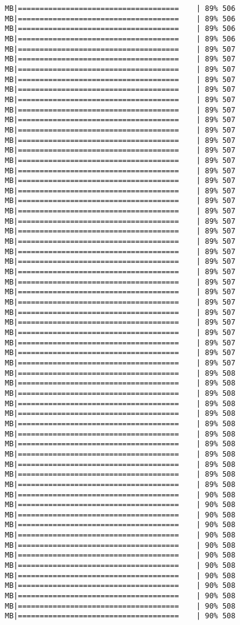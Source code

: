 \documentclass[
]{article}
\begin{document}
\begin{verbatim}
MB|=====================================    | 89% 506 MB|=====================================    | 89% 506 MB|=====================================    | 89% 506 MB|=====================================    | 89% 506 MB|=====================================    | 89% 507 MB|=====================================    | 89% 507 MB|=====================================    | 89% 507 MB|=====================================    | 89% 507 MB|=====================================    | 89% 507 MB|=====================================    | 89% 507 MB|=====================================    | 89% 507 MB|=====================================    | 89% 507 MB|=====================================    | 89% 507 MB|=====================================    | 89% 507 MB|=====================================    | 89% 507 MB|=====================================    | 89% 507 MB|=====================================    | 89% 507 MB|=====================================    | 89% 507 MB|=====================================    | 89% 507 MB|=====================================    | 89% 507 MB|=====================================    | 89% 507 MB|=====================================    | 89% 507 MB|=====================================    | 89% 507 MB|=====================================    | 89% 507 MB|=====================================    | 89% 507 MB|=====================================    | 89% 507 MB|=====================================    | 89% 507 MB|=====================================    | 89% 507 MB|=====================================    | 89% 507 MB|=====================================    | 89% 507 MB|=====================================    | 89% 507 MB|=====================================    | 89% 507 MB|=====================================    | 89% 507 MB|=====================================    | 89% 507 MB|=====================================    | 89% 507 MB|=====================================    | 89% 507 MB|=====================================    | 89% 508 MB|=====================================    | 89% 508 MB|=====================================    | 89% 508 MB|=====================================    | 89% 508 MB|=====================================    | 89% 508 MB|=====================================    | 89% 508 MB|=====================================    | 89% 508 MB|=====================================    | 89% 508 MB|=====================================    | 89% 508 MB|=====================================    | 89% 508 MB|=====================================    | 89% 508 MB|=====================================    | 89% 508 MB|=====================================    | 90% 508 MB|=====================================    | 90% 508 MB|=====================================    | 90% 508 MB|=====================================    | 90% 508 MB|=====================================    | 90% 508 MB|=====================================    | 90% 508 MB|=====================================    | 90% 508 MB|=====================================    | 90% 508 MB|=====================================    | 90% 508 MB|=====================================    | 90% 508 MB|=====================================    | 90% 508 MB|=====================================    | 90% 508 MB|=====================================    | 90% 508 
\end{verbatim}
\end{document}
